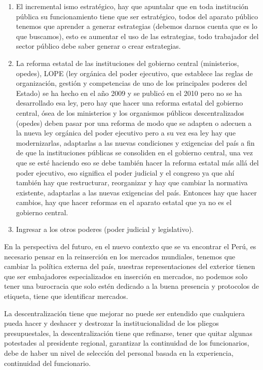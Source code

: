 \documentclass[
  a4paper,
]{article}
\providecommand{\tightlist}{%
  \setlength{\itemsep}{0pt}\setlength{\parskip}{0pt}}\usepackage{longtable,booktabs,array}
\begin{document}
\begin{enumerate}
\def\labelenumi{\arabic{enumi}.}
\tightlist
\item
  El incremental ismo estratégico, hay que apuntalar que en toda
  institución pública su funcionamiento tiene que ser estratégico, todos
  del aparato público tenemos que aprender a generar estrategias
  (debemos darnos cuenta que es lo que buscamos), esto es aumentar el
  uso de las estrategias, todo trabajador del sector público debe saber
  generar o crear estrategias.
\item
  La reforma estatal de las instituciones del gobierno central
  (ministerios, opedes), LOPE (ley orgánica del poder ejecutivo, que
  establece las reglas de organización, gestión y competencias de uno de
  los principales poderes del Estado) se ha hecho en el año 2009 y se
  publicó en el 2010 pero no se ha desarrollado esa ley, pero hay que
  hacer una reforma estatal del gobierno central, ósea de los
  ministerios y los organismos públicos descentralizados (opedes) deben
  pasar por una reforma de modo que se adapten o adecuen a la nueva ley
  orgánica del poder ejecutivo pero a su vez esa ley hay que
  modernizarlas, adaptarlas a las nuevas condiciones y exigencias del
  país a fin de que la instituciones públicas se consoliden en el
  gobierno central, una vez que se esté haciendo eso se debe también
  hacer la reforma estatal más allá del poder ejecutivo, eso significa
  el poder judicial y el congreso ya que ahí también hay que
  restructurar, reorganizar y hay que cambiar la normativa existente,
  adaptarlas a las nuevas exigencias del país. Entonces hay que hacer
  cambios, hay que hacer reformas en el aparato estatal que ya no es el
  gobierno central.
\item
  Ingresar a los otros poderes (poder judicial y legislativo).
\end{enumerate}

En la perspectiva del futuro, en el nuevo contexto que se va encontrar
el Perú, es necesario pensar en la reinserción en los mercados
mundiales, tenemos que cambiar la política externa del país, nuestras
representaciones del exterior tienen que ser embajadores especializados
en inserción en mercados, no podemos solo tener una burocracia que solo
estén dedicado a la buena presencia y protocolos de etiqueta, tiene que
identificar mercados.

La descentralización tiene que mejorar no puede ser entendido que
cualquiera pueda hacer y deshacer y destrozar la institucionalidad de
los pliegos presupuestales, la descentralización tiene que refinarse,
tener que quitar algunas potestades al presidente regional, garantizar
la continuidad de los funcionarios, debe de haber un nivel de selección
del personal basada en la experiencia, continuidad del funcionario.
\end{document}
